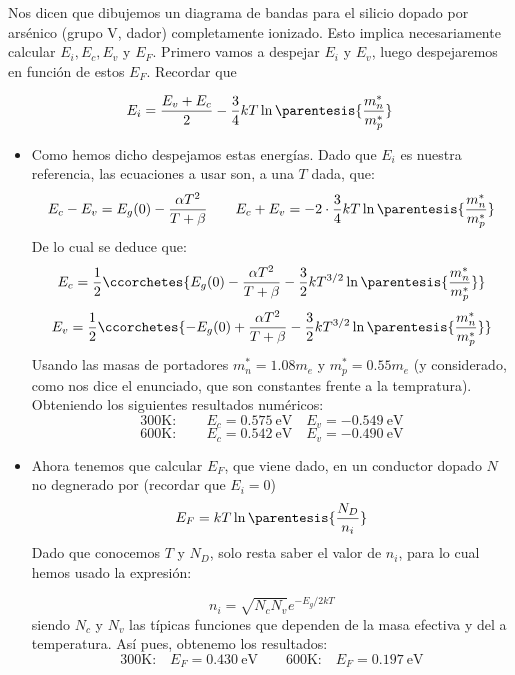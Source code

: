 
	Nos dicen que dibujemos un diagrama de bandas para el silicio dopado por arsénico (grupo V, dador) completamente ionizado. Esto implica necesariamente calcular $E_i,E_c,E_v$ y $E_F$. Primero vamos a despejar $E_i$ y $E_v$, luego despejaremos en función de estos $E_F$. Recordar que

	\begin{equation}
		E_i = \frac{E_v+E_c}{2} - \frac{3}{4} kT \ln\parentesis{\frac{m_n^*}{m_p^*}}
	\end{equation}

	\begin{itemize}
		\item Como hemos dicho despejamos estas energías. Dado que $E_i$ es nuestra referencia, las ecuaciones a usar son, a una $T$ dada, que:
		\begin{equation}
			E_c-E_v = E_g(0) - \frac{\alpha T^2}{T+\beta} \qquad E_c+E_v=-2 \cdot \frac{3}{4} kT\ln \parentesis{\frac{m_n^*}{m_p^*}}
		\end{equation}
		De lo cual se deduce que:
		\begin{equation}
			E_c = \frac{1}{2} \ccorchetes{E_g(0) - \frac{\alpha T^2}{T+\beta} - \frac{3}{2} kT^{3/2} \ln \parentesis{\frac{m_n^*}{m_p^*}}}
		\end{equation}
		\begin{equation}
			E_v = \frac{1}{2} \ccorchetes{-E_g(0) +\frac{\alpha T^2}{T+\beta} - \frac{3}{2} kT^{3/2} \ln \parentesis{\frac{m_n^*}{m_p^*}}}
		\end{equation}
		Usando las masas de portadores $m_n^*=1.08m_e$ y $m_p^*=0.55m_e$  (y considerado, como nos dice el enunciado, que son constantes frente a la tempratura). Obteniendo los siguientes resultados numéricos:
		\begin{equation}
			\text{300K}: \qquad
			E_c = 0.575 \ \text{eV} \quad E_v = -0.549 \ \text{eV}
		\end{equation}
		\begin{equation}
			\text{600K}: \qquad
			E_c = 0.542  \ \text{eV} \quad E_v = -0.490 \ \text{eV}
		\end{equation}
		\item Ahora tenemos que calcular $E_F$, que viene dado, en un conductor dopado $N$ no degnerado por (recordar que $E_i=0$)
		\begin{equation}
			E_F = kT \ln \parentesis{\frac{N_D}{n_i}}
		\end{equation}
		Dado que conocemos $T$ y $N_D$, solo resta saber el valor de $n_i$, para lo cual hemos usado la expresión:

		\begin{equation}
			n_i = \sqrt{N_c N_v} e^{-E_g/2kT}
		\end{equation}
		siendo $N_c$ y $N_v$ las típicas funciones que dependen de la masa efectiva y del a temperatura. Así pues, obtenemo los resultados:
		\begin{equation}
			\text{300K:}\quad
			E_F = 0.430 \ \text{eV} \qquad
			\text{600K:}\quad
			E_F= 0.197 \ \text{eV}
		\end{equation}
	\end{itemize}
